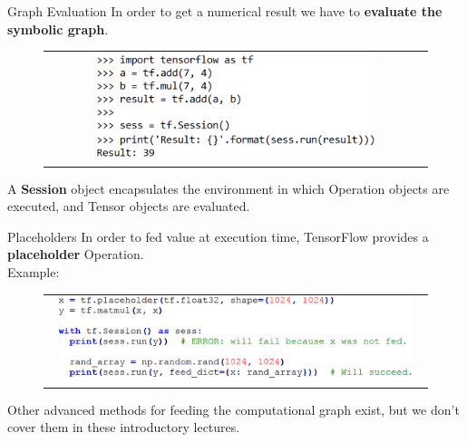 \documentclass[aspectratio=169]{beamer}
\begin{document}

\begin{frame}{Graph Evaluation}
In order to get a numerical result we have to \textbf{evaluate the symbolic graph}.\\
\begin{figure}
\begin{tabular}{c}
\includegraphics[width=0.75\textwidth]{img/tf/graph_evaluation.png}
\end{tabular}
\end{figure}
A \textbf{Session} object encapsulates the environment in which Operation objects are executed, and Tensor objects are evaluated.
\end{frame}


\begin{frame}{Placeholders}
In order to fed value at execution time, TensorFlow provides a \textbf{placeholder} Operation.\\
\vspace{0.25cm}
Example:
\begin{figure}
\begin{tabular}{c}
\includegraphics[width=0.95\textwidth]{img/tf/placeholders.png}
\end{tabular}
\end{figure}
Other advanced methods for feeding the computational graph exist, but we don't cover them in these introductory lectures.
\end{frame}

\end{document}
